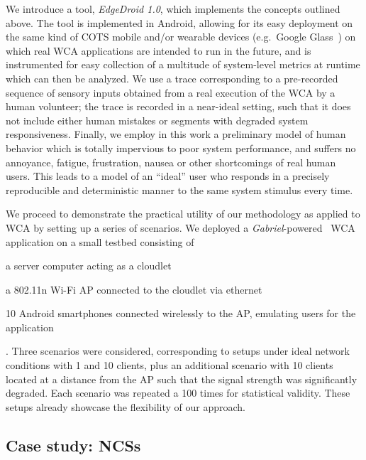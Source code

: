 We introduce a tool, \emph{EdgeDroid \num{1.0}}, which implements the concepts outlined above.
The tool is implemented in Android, allowing for its easy deployment on the same kind of \gls{COTS} mobile and/or wearable devices (e.g.\ Google Glass~\cite{googleglass}) on which real \gls{WCA} applications are intended to run in the future, and is instrumented for easy collection of a multitude of system-level metrics at runtime which can then be analyzed.
We use a trace corresponding to a pre-recorded sequence of sensory inputs obtained from a real execution of the \gls{WCA} by a human volunteer;
the trace is recorded in a near-ideal setting, such that it does not include either human mistakes or segments with degraded system responsiveness.
Finally, we employ in this work a preliminary model of human behavior which is totally impervious to poor system performance, and suffers no annoyance, fatigue, frustration, nausea or other shortcomings of real human users.
This leads to a model of an ``ideal'' user who responds in a precisely reproducible and deterministic manner to the same system stimulus every time.

\medskip
We proceed to demonstrate the practical utility of our methodology as applied to \gls{WCA} by setting up a series of scenarios.
We deployed a \emph{Gabriel}-powered~\cite{chen2018application} \gls{WCA} application on a small testbed consisting of
\begin{inlineenum}
    \item a server computer acting as a cloudlet
    \item a 802.11n Wi-Fi \gls{AP} connected to the cloudlet via ethernet
    \item \num{10} Android smartphones connected wirelessly to the \gls{AP}, emulating users for the application
\end{inlineenum}.
Three scenarios were considered, corresponding to setups under ideal network conditions with \num{1} and \num{10} clients, plus an additional scenario with \num{10} clients located at a distance from the \gls{AP} such that the signal strength was significantly degraded.
Each scenario was repeated a \num{100} times for statistical validity.
These setups already showcase the flexibility of our approach.


\subsection{Case study: \acsp{NCS}}\label{summary:methodology:usecase_ncs}

